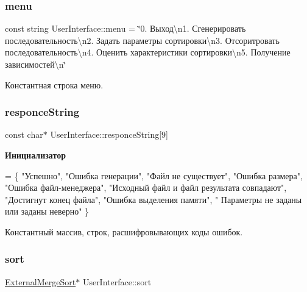 \subsubsection{\texorpdfstring{menu}{menu}}
{\footnotesize\ttfamily const string User\+Interface\+::menu = \char`\"{}0. Выход\textbackslash{}n1. Сгенерировать последовательность\textbackslash{}n2. Задать параметры сортировки\textbackslash{}n3. Отсоритровать последовательность\textbackslash{}n4. Оценить характеристики сортировки\textbackslash{}n5. Получение зависимостей\textbackslash{}n\char`\"{}\hspace{0.3cm}{\ttfamily [private]}}



Константная строка меню. 

\hypertarget{class_user_interface_a3ec4a2871150fd6b83ddf9d459aa0afc}{}\label{class_user_interface_a3ec4a2871150fd6b83ddf9d459aa0afc} 
\subsubsection{\texorpdfstring{responce\+String}{responceString}}
{\footnotesize\ttfamily const char$\ast$ User\+Interface\+::responce\+String\mbox{[}9\mbox{]}\hspace{0.3cm}{\ttfamily [private]}}

{\bfseries Инициализатор}
\begin{DoxyCode}
= \{ \textcolor{stringliteral}{"Успешно"}, \textcolor{stringliteral}{"Ошибка генерации"}, \textcolor{stringliteral}{"Файл не существует"}, \textcolor{stringliteral}{"Ошибка размера"}, \textcolor{stringliteral}{"Ошибка файл-менеджера"},
        \textcolor{stringliteral}{"Исходный файл и файл результата совпадают"}, \textcolor{stringliteral}{"Достигнут конец файла"}, \textcolor{stringliteral}{"Ошибка выделения памяти"}, \textcolor{stringliteral}{"
      Параметры не заданы или заданы неверно"} \}
\end{DoxyCode}


Константный массив, строк, расшифровывающих коды ошибок. 

\hypertarget{class_user_interface_af3405ffdb7e2834c2cf63662b5415a91}{}\label{class_user_interface_af3405ffdb7e2834c2cf63662b5415a91} 
\subsubsection{\texorpdfstring{sort}{sort}}
{\footnotesize\ttfamily \hyperlink{class_external_merge_sort}{External\+Merge\+Sort}$\ast$ User\+Interface\+::sort\hspace{0.3cm}{\ttfamily [private]}}




